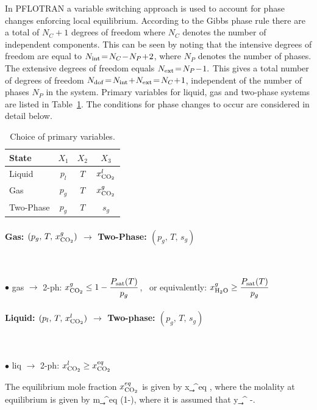 In PFLOTRAN a variable switching approach is used to account for phase changes enforcing local equilibrium. According to the Gibbs phase rule there are a total of $N_C\!+\!1$ degrees of freedom where $N_C$ denotes the number of independent components. This can be seen by noting that the
intensive
degrees of freedom are equal to $N_{\rm int}\!=\!N_C \!-\! N_P \!+\!2$, where $N_P$ denotes the number of phases. The 
extensive
degrees of freedom equals $N_{\rm ext}\!=\!N_P\!-\!1.$ This gives a total number of degrees of freedom $N_{\rm dof}\!=\!N_{\rm int}\!+\!N_{\rm ext}\!=\!N_C\!+\!1$, independent of the number of phases $N_P$ in the system.
Primary variables for liquid, gas and two-phase systems are listed in Table~\ref{tvar}.
The conditions for phase changes to occur are considered in detail below.

\begin{table}\centering
\caption{Choice of primary variables.}\label{tvar}

\vspace{3mm}

\begin{tabular}{lccc}
\toprule
State & $X_1$ & $X_2$ & $X_3$\\
\midrule
Liquid & $p_l$ & $T$ & $x_{\rm CO_2}^l$\\
Gas & $p_g$ & $T$ & $x_{\rm CO_2}^g$\\
Two-Phase & $p_g$ & $T$ & $s_g$\\
\bottomrule
\end{tabular}
\end{table}


\paragraph{Gas: $(p_g,\,T,\,x_{\rm CO_2}^g)$ $\rightarrow$ Two-Phase: $(p_g,\,T,\,s_g^{})$} ~

$\bullet$ gas $\rightarrow$ 2-ph: $x_{\rm CO_2}^g \leq 1-\dfrac{P_{\rm sat}(T)}{p_g}$, \ or equivalently: $x_{\rm H_2O}^g \geq \dfrac{P_{\rm sat}(T)}{p_g}$

\paragraph{Liquid: $(p_l,\,T,\,x_{\rm CO_2}^l)$ $\rightarrow$ Two-phase: $(p_g,\,T,\,s_g^{})$} ~

$\bullet$ liq $\rightarrow$ 2-ph: $x_{\rm CO_2}^l \geq x_{\rm CO_2}^{eq}$

\noindent
The equilibrium mole fraction $x_{\rm CO_2}^{eq}$ is given by
\EQ
x_\c^{eq} \eq {},
\EN
where the molality at equilibrium is given by
\EQ
m_\c^{eq} \eq \left(1-\right),
\EN
where it is assumed that 
\EQ
y_\c^{} -.
\EN

